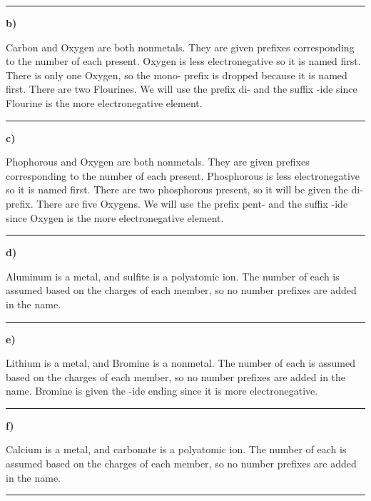 \documentclass[12pt, oneside, letterpaper]{book}
\begin{document}

\hrule

\textbf{b) }

Carbon and Oxygen are both nonmetals. They are given prefixes corresponding to the number of each present. Oxygen is less electronegative so it is named first. There is only one Oxygen, so the mono- prefix is dropped because it is named first. There are two Flourines. We will use the prefix di- and the suffix -ide since Flourine is the more electronegative element. 


\hrule

\textbf{c) }

Phophorous and Oxygen are both nonmetals. They are given prefixes corresponding to the number of each present. Phosphorous is less electronegative so it is named first. There are two phosphorous present, so it will be given the di- prefix. There are five Oxygens. We will use the prefix pent- and the suffix -ide since Oxygen is the more electronegative element. 


\hrule

\textbf{d) }

Aluminum is a metal, and sulfite is a polyatomic ion. The number of each is assumed based on the charges of each member, so no number prefixes are added in the name. 


\hrule

\textbf{e) }

Lithium is a metal, and Bromine is a nonmetal. The number of each is assumed based on the charges of each member, so no number prefixes are added in the name. Bromine is given the -ide ending since it is more electronegative. 


\hrule

\textbf{f) }

Calcium is a metal, and carbonate is a polyatomic ion. The number of each is assumed based on the charges of each member, so no number prefixes are added in the name. 


\hrule
\end{document}
